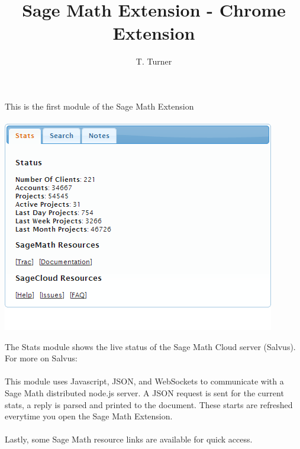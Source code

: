 \documentclass{beamer}
\title{Sage Math Extension - Chrome Extension}
\author{T. Turner}\institute{University of Washington}
\begin{document}
\begin{frame}
\titlepage

\end{frame}

\begin{frame}
This is the first module of the Sage Math Extension
\\~\\
\includegraphics[width=.9\textwidth]{mod1.png}
\end{frame}
\begin{frame}
The Stats module shows the live status of the Sage Math Cloud server (Salvus). For more on Salvus: \href{http://salvusmath.blogspot.com/2012/12/what-is-salvus-i-started-salvus-project.html}{}
\\~\\
This module uses Javascript, JSON, and WebSockets to communicate with a Sage Math distributed node.js server. A JSON request is sent for the current stats, a reply is parsed and printed to the document. These starts are refreshed everytime you open the Sage Math Extension.
\\~\\
Lastly, some Sage Math resource links are available for quick access.
\end{frame}
\end{document}
